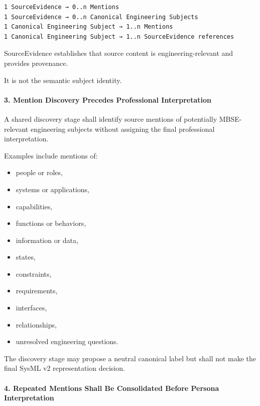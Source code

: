 \begin{verbatim}
1 SourceEvidence → 0..n Mentions
1 SourceEvidence → 0..n Canonical Engineering Subjects
1 Canonical Engineering Subject → 1..n Mentions
1 Canonical Engineering Subject → 1..n SourceEvidence references
\end{verbatim}

SourceEvidence establishes that source content is engineering-relevant and provides provenance.

It is not the semantic subject identity.

\hypertarget{3-mention-discovery-precedes-professional-interpretation}{%
\paragraph{3. Mention Discovery Precedes Professional Interpretation}\label{3-mention-discovery-precedes-professional-interpretation}}

A shared discovery stage shall identify source mentions of potentially MBSE-relevant engineering subjects without assigning the final professional interpretation.

Examples include mentions of:

\begin{itemize}
\tightlist
\item
  people or roles,
\item
  systems or applications,
\item
  capabilities,
\item
  functions or behaviors,
\item
  information or data,
\item
  states,
\item
  constraints,
\item
  requirements,
\item
  interfaces,
\item
  relationships,
\item
  unresolved engineering questions.
\end{itemize}

The discovery stage may propose a neutral canonical label but shall not make the final SysML v2 representation decision.

\hypertarget{4-repeated-mentions-shall-be-consolidated-before-persona-interpretation}{%
\paragraph{4. Repeated Mentions Shall Be Consolidated Before Persona Interpretation}\label{4-repeated-mentions-shall-be-consolidated-before-persona-interpretation}}

